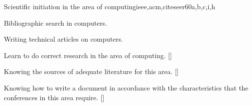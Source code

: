 \begin{syllabus}
\begin{unit}{}{Scientific initiation in the area of computing}{ieee,acm,citeseer}{60}{a,b,c,i,h}
  \begin{topics}
      \item Bibliographic search in computers.
      \item Writing technical articles on computers.
  \end{topics}
  \begin{learningoutcomes}
      \item Learn to do correct research in the area of computing. [\Usage]
      \item Knowing the sources of adequate literature for this area. [\Usage]
      \item Knowing how to write a document in accordance with the characteristics that the conferences in this area require. [\Usage]
  \end{learningoutcomes}
\end{unit}

\begin{coursebibliography}
\end{coursebibliography}

\end{syllabus}
